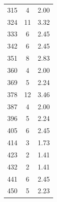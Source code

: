 \begin{table}
\begin{minipage}{0.2\textwidth}
\begin{tabular}{c|c|c}
	315&4&2.00\\
	324&11&3.32\\
	333&6&2.45\\
	342&6&2.45\\
	351&8&2.83\\
	360&4&2.00\\
	369&5&2.24\\
	378&12&3.46\\
	387&4&2.00\\
	396&5&2.24\\
	405&6&2.45\\
	414&3&1.73\\
	423&2&1.41\\
	432&2&1.41\\
	441&6&2.45\\
	450&5&2.23\\
	\bottomrule 
	\end{tabular}
\end{minipage}
\end{table}

